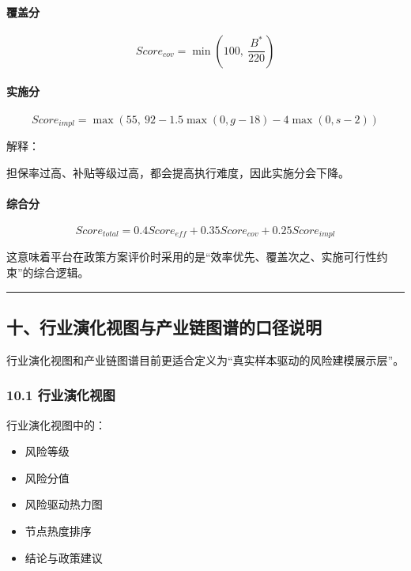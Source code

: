 \documentclass[
]{article}
\providecommand{\tightlist}{%
  \setlength{\itemsep}{0pt}\setlength{\parskip}{0pt}}
\begin{document}
\paragraph{覆盖分}\label{ux8986ux76d6ux5206}

\[
Score_{cov} = \min\left(100,\ \frac{B^{*}}{220}\right)
\]

\paragraph{实施分}\label{ux5b9eux65bdux5206}

\[
Score_{impl} = \max\left(55,\ 92 - 1.5\max(0,g-18) - 4\max(0,s-2)\right)
\]

解释：

担保率过高、补贴等级过高，都会提高执行难度，因此实施分会下降。

\paragraph{综合分}\label{ux7efcux5408ux5206}

\[
Score_{total} = 0.4Score_{eff} + 0.35Score_{cov} + 0.25Score_{impl}
\]

这意味着平台在政策方案评价时采用的是``效率优先、覆盖次之、实施可行性约束''的综合逻辑。

\begin{center}\rule{0.5\linewidth}{0.5pt}\end{center}

\subsection{十、行业演化视图与产业链图谱的口径说明}\label{ux5341ux884cux4e1aux6f14ux5316ux89c6ux56feux4e0eux4ea7ux4e1aux94feux56feux8c31ux7684ux53e3ux5f84ux8bf4ux660e}

行业演化视图和产业链图谱目前更适合定义为``真实样本驱动的风险建模展示层''。

\subsubsection{10.1
行业演化视图}\label{ux884cux4e1aux6f14ux5316ux89c6ux56fe}

行业演化视图中的：

\begin{itemize}
\tightlist
\item
  风险等级
\item
  风险分值
\item
  风险驱动热力图
\item
  节点热度排序
\item
  结论与政策建议
\end{itemize}
\end{document}
